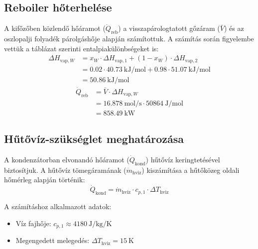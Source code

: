 \subsection{Reboiler hőterhelése}
A kifőzőben közlendő hőáramot ($\dot{Q}_{\text{reb}}$) a visszapárologtatott
gőzáram ($\bar{V}$) és az oszlopalji folyadék párolgáshője alapján
számítottuk. A számítás során figyelembe vettük a táblázat szerinti
entalpiakülönbségeket is:
\begin{equation}
  \begin{split}
    \Delta H_{\text{vap},W} &= x_W \cdot \Delta H_{\text{vap},1} + (1 - x_W) \cdot
    \Delta H_{\text{vap},2}\\
    &= \num{0.02} \cdot \qty{40.73}{\kilo\joule\per\mol} + \num{0.98} \cdot
    \qty{51.07}{\kilo\joule\per\mol}\\
    &= \qty{50.86}{\kilo\joule\per\mol}
  \end{split}
\end{equation}
\begin{equation}
  \begin{split}
    \dot{Q}_{\text{reb}} &= \bar{V} \cdot \Delta H_{\text{vap},W}\\
    &= \qty{16.878}{\mol\per\second} \cdot
    \qty{50864}{\joule\per\mol}\\
    &= \qty{858.49}{\kilo\watt}
  \end{split}
\end{equation}

\subsection{Hűtővíz-szükséglet meghatározása}

A kondenzátorban elvonandó hőáramot ($\dot{Q}_{\text{kond}}$) hűtővíz keringtetésével biztosítjuk. A hűtővíz tömegáramának ($\dot{m}_{\text{hviz}}$) kiszámítása a hűtőközeg oldali hőmérleg alapján történik:
\begin{equation}
    \dot{Q}_{\text{kond}} = \dot{m}_{\text{hviz}} \cdot c_{p, 1} \cdot \Delta T_{\text{hviz}}
\end{equation}

A számításhoz alkalmazott adatok:
\begin{itemize}
    \item Víz fajhője: $c_{p, 1} \approx \qty{4180}{\joule\per\kg\per\K}$
    \item Megengedett melegedés: $\Delta T_{\text{hviz}} = \qty{15}{\kelvin}$
\end{itemize}

